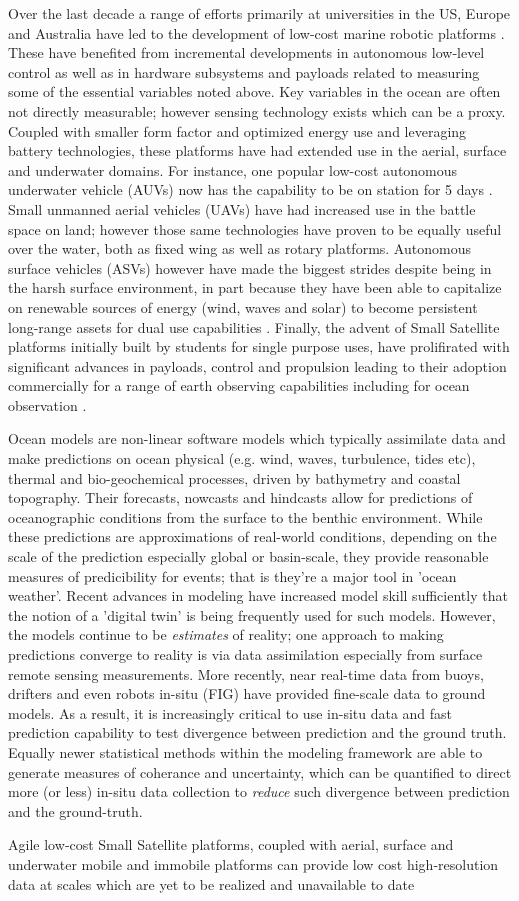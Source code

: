 Over the last decade a range of efforts primarily at universities in
the US, Europe and Australia have led to the development of low-cost
marine robotic platforms \cite{}. These have benefited from
incremental developments in autonomous low-level control \cite{} as
well as in hardware subsystems and payloads related to measuring some
of the essential variables noted above. Key variables in the ocean are
often not directly measurable; however sensing technology exists which
can be a proxy. Coupled with smaller form factor and optimized energy
use and leveraging battery technologies, these platforms have had
extended use in the aerial, surface and underwater domains. For
instance, one popular low-cost autonomous underwater vehicle (AUVs)
now has the capability to be on station for 5 days \cite{}. Small
unmanned aerial vehicles (UAVs) have had increased use in the battle
space on land; however those same technologies have proven to be
equally useful over the water, both as fixed wing as well as rotary
platforms. Autonomous surface vehicles (ASVs) however have made the
biggest strides despite being in the harsh surface environment, in
part because they have been able to capitalize on renewable sources of
energy (wind, waves and solar) to become persistent long-range assets
for dual use capabilities \cite{}. Finally, the advent of Small
Satellite platforms initially built by students for single purpose
uses, have prolifirated with significant advances in payloads, control
and propulsion leading to their adoption commercially for a range of
earth observing capabilities including for ocean observation \cite{}.

Ocean models are non-linear software models which typically assimilate
data and make predictions on ocean physical (e.g. wind, waves,
turbulence, tides etc), thermal and bio-geochemical processes, driven
by bathymetry and coastal topography. Their forecasts, nowcasts and
hindcasts allow for predictions of oceanographic conditions from the
surface to the benthic environment. While these predictions are
approximations of real-world conditions, depending on the scale of the
prediction especially global or basin-scale, they provide reasonable
measures of predicibility for events; that is they're a major tool in
'ocean weather'. Recent advances in modeling have increased model
skill sufficiently that the notion of a 'digital twin' is being
frequently used for such models. However, the models continue to be
\emph{estimates} of reality; one approach to making predictions
converge to reality is via data assimilation especially from surface
remote sensing measurements. More recently, near real-time data from
buoys, drifters and even robots in-situ (FIG) have provided fine-scale
data to ground models. As a result, it is increasingly critical to use
in-situ data and fast prediction capability to test divergence between
prediction and the ground truth. Equally newer statistical methods
\cite{} within the modeling framework are able to generate measures of
coherance and uncertainty, which can be quantified to direct more (or
less) in-situ data collection to \emph{reduce} such divergence between
prediction and the ground-truth. 



Agile low‐cost Small Satellite platforms, coupled with aerial, surface
and underwater mobile and immobile platforms can provide low cost
high‐resolution data at scales which are yet to be realized and
unavailable to date

